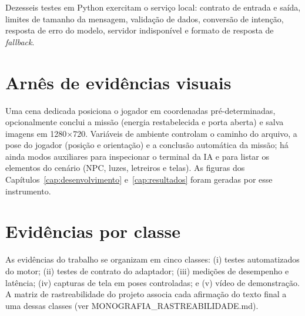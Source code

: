 Dezesseis testes em Python exercitam o serviço local: contrato de entrada e
saída, limites de tamanho da mensagem, validação de dados, conversão de
intenção, resposta de erro do modelo, servidor indisponível e formato de
resposta de \emph{fallback}.

\section*{Arnês de evidências visuais}
\label{ap:arnes}

Uma cena dedicada posiciona o jogador em coordenadas pré-determinadas,
opcionalmente conclui a missão (energia restabelecida e porta aberta) e salva
imagens em 1280$\times$720. Variáveis de ambiente controlam o caminho do
arquivo, a pose do jogador (posição e orientação) e a conclusão automática da
missão; há ainda modos auxiliares para inspecionar o terminal da IA e para
listar os elementos do cenário (NPC, luzes, letreiros e telas). As figuras
dos Capítulos~\ref{cap:desenvolvimento} e~\ref{cap:resultados} foram geradas
por esse instrumento.

\section*{Evidências por classe}
\label{ap:evidencias}

As evidências do trabalho se organizam em cinco classes: (i) testes
automatizados do motor; (ii) testes de contrato do adaptador; (iii) medições
de desempenho e latência; (iv) capturas de tela em poses controladas; e (v)
vídeo de demonstração. A matriz de rastreabilidade do projeto associa cada
afirmação do texto final a uma dessas classes (ver
MONOGRAFIA\_RASTREABILIDADE.md).
